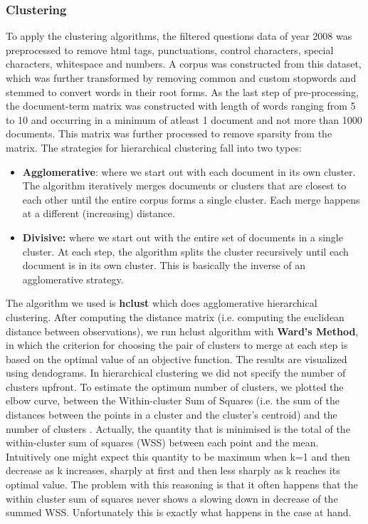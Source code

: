 \documentclass[journal]{IEEEtran}
\begin{document}
\vspace{0.5cm}

\subsubsection{Clustering}
To apply the clustering algorithms, the filtered questions data of year 2008 was preprocessed to remove html tags, punctuations, control characters, special characters, whitespace and numbers. A corpus was constructed from this dataset, which was further transformed by removing common and custom stopwords and stemmed to convert words in their root forms. As the last step of pre-processing, the document-term matrix was constructed with length of words ranging from 5 to 10 and occurring in a minimum of atleast 1 document and not more than 1000 documents. This matrix was further processed to remove sparsity from the matrix. The strategies for hierarchical clustering fall into two types:
\begin{itemize}
    \item \textbf{Agglomerative}: where we start out with each document in its own cluster. The algorithm iteratively merges documents or clusters that are closest to each other until the entire corpus forms a single cluster. Each merge happens at a different (increasing) distance.
    \item \textbf{Divisive:} where we start out with the entire set of documents in a single cluster. At each step, the algorithm splits the cluster recursively until each document is in its own cluster. This is basically the inverse of an agglomerative strategy.
\end{itemize}
The algorithm we used is \textbf{hclust} which does agglomerative hierarchical clustering. After computing the distance matrix (i.e. computing the euclidean distance between observations), we run hclust algorithm with \textbf{Ward's Method}, in which the criterion for choosing the pair of clusters to merge at each step is based on the optimal value of an objective function. The results are visualized using dendograms.
In hierarchical clustering we did not specify the number of clusters upfront. To estimate the optimum number of clusters, we plotted the elbow curve, between the Within-cluster Sum of Squares (i.e. the sum of the distances between the points in a cluster and the cluster’s centroid) and the number of clusters . Actually, the quantity that is minimised is the total of the within-cluster sum of squares (WSS) between each point and the mean. Intuitively one might expect this quantity to be maximum when k=1 and then decrease as k increases, sharply at first and then less sharply as k reaches its optimal value.
The problem with this reasoning is that it often happens that the within cluster sum of squares never shows a slowing down in decrease of the summed WSS. Unfortunately this is exactly what happens in the case at hand.
\end{document}
